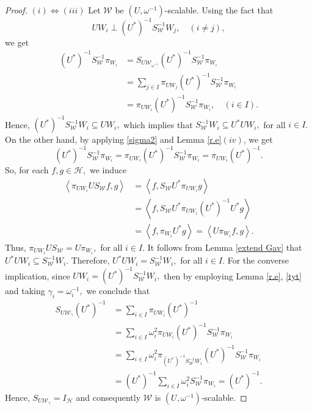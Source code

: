 \documentclass[sn-mathphys-num]{sn-jnl}%
\theoremstyle{definition}
\theoremstyle{remark}
\numberwithin{equation}{section}
\begin{document}
\begin{proof}
$(i)\Leftrightarrow (iii)$ Let $\mathcal{W}$ be $\left( U,\omega^{-1}\right) $-scalable. Using the fact that
\begin{equation}\label{tyt}
UW_{i}\perp \left( U^*\right) ^{-1}S_{\mathcal{W}}^{-1}W_{j},\quad (i\neq j),
\end{equation}
we get
\begin{equation}\label{sigma2}
\begin{aligned}
\left( U^*\right) ^{-1}S_{\mathcal{W}}^{-1}\pi_{W_{i}}&=S_{U\mathcal{W}_{\omega^{-1}}}\left( U^*\right) ^{-1}S_{\mathcal{W}}^{-1}\pi_{W_{i}}
\\&=\sum_{j \in I}\pi_{UW_{j}}\left( U^*\right) ^{-1}S_{\mathcal{W}}^{-1}\pi_{W_{i}}
\\&=\pi_{UW_{i}}\left( U^*\right) ^{-1}S_{\mathcal{W}}^{-1}\pi_{W_{i}}, \quad (i \in I).
\end{aligned}
\end{equation}
Hence, $ \left( U^*\right) ^{-1}S_{\mathcal{W}}^{-1}W_{i}\subseteq UW_{i} ,$ which implies that $S_{\mathcal{W}}^{-1}W_{i}\subseteq U^*UW_{i},$ for all $i \in I$.
On the other hand, by applying \eqref{sigma2} and Lemma \ref{r.e}$(iv)$, we get
\begin{equation*}
\left( U^*\right) ^{-1}S_{\mathcal{W}}^{-1}\pi_{W_{i}}=\pi_{UW_{i}}\left( U^*\right) ^{-1}S_{\mathcal{W}}^{-1}\pi_{W_{i}}=\pi_{UW_{i}}\left( U^*\right) ^{-1}.
\end{equation*}
So, for each $f,g \in \mathcal {H},$ we induce
\begin{align*}
\left\langle  \pi_{UW_{i}}US_{\mathcal{W}}f,g \right\rangle  &= \left\langle f , S_{\mathcal{W}}U^{*}\pi_{UW_{i}}g \right\rangle 
\\&= \left\langle f , S_{\mathcal{W}}U^{*}\pi_{UW_{i}}\left( U^*\right) ^{-1}U^*g \right\rangle 
\\&= \left\langle f , \pi_{W_{i}}U^*g \right\rangle  = \left\langle  U\pi_{W_{i}}f,g \right\rangle.
\end{align*}
Thus, $\pi_{UW_{i}}US_{\mathcal{W}}=U\pi_{W_{i}},$ for all $i \in I.$ It follows from Lemma \ref{extend Gav} that $U^*UW_{i}\subseteq S_{\mathcal{W}}^{-1}W_{i}.$ Therefore, $U^*UW_{i}=S_{\mathcal{W}}^{-1}W_{i},$ for all $i \in I$. For the converse implication, since $UW_{i}=\left( U^*\right) ^{-1}S_{\mathcal{W}}^{-1}W_{i},$ then by employing Lemma \ref{r.e}, \eqref{tyt} and taking $ \gamma_{i}=\omega_{i}^{-1},$ we conclude that
\begin{align*}
S_{U\mathcal{W}_{\gamma}}\left( U^*\right) ^{-1}&=\sum_{i \in I}\pi_{UW_{i}}\left( U^*\right) ^{-1}
\\&=\sum_{i \in I}\omega_{i}^{2}\pi_{UW_{i}}\left( U^*\right) ^{-1}S_{\mathcal{W}}^{-1}\pi_{W_{i}}
\\&=\sum_{i \in I}\omega_{i}^{2}\pi_{\left( U^*\right) ^{-1}S_{\mathcal{W}}^{-1}W_{i}}\left( U^*\right) ^{-1}S_{\mathcal{W}}^{-1}\pi_{W_{i}}
\\&=\left( U^*\right) ^{-1}\sum_{i \in I}\omega_{i}^{2}S_{\mathcal{W}}^{-1}\pi_{W_{i}}=\left( U^*\right) ^{-1}.
\end{align*}
Hence, $S_{U\mathcal{W}_{\gamma}}=I_{\mathcal {H}}$ and consequently $\mathcal{W}$ is $\left( U,\omega^{-1}\right) $-scalable.


\end{proof}
\end{document}

